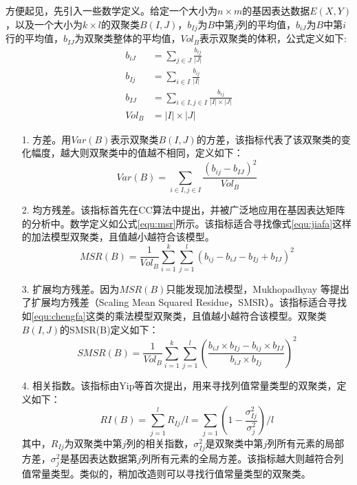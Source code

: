   方便起见，先引入一些数学定义。给定一个大小为$n\times m$的基因表达数据$E(X,Y)$，以及一个大小为$k\times l$的双聚类$B(I,J)$，$b_{Ij}$为$B$中第$j$列的平均值，$b_{iJ}$为$B$中第$i$行的平均值，$b_{IJ}$为双聚类整体的平均值，$Vol_B$表示双聚类的体积，公式定义如下:
  \begin{align}
    b_{iJ} &= \sum_{j\in J}\frac{b_{ij}}{|J|} \\
    b_{Ij} &= \sum_{i\in I}\frac{b_{ij}}{|I|} \\
    b_{IJ} &= \sum_{i\in I,j\in I}\frac{ b_{ij} }{|I| \times |J|}\\
    Vol_B &= |I| \times |J|
  \end{align}
  \begin{enumerate}
    \item[1.] 方差。用$Var(B)$表示双聚类$B(I,J)$的方差，该指标代表了该双聚类的变化幅度，越大则双聚类中的值越不相同，定义如下：
    \begin{equation}
      Var(B) = \sum_{i\in I,j\in I}\frac{(b_{ij}-b_{IJ})^2}{Vol_B}
    \end{equation}

    \item[2.] 均方残差。该指标首先在CC算法中提出，并被广泛地应用在基因表达矩阵的分析中。数学定义如公式\ref{equ:msr}所示。该指标适合寻找像式\ref{equ:jiafa}这样的加法模型双聚类，且值越小越符合该模型。
    \begin{equation}\label{equ:msr}
      MSR(B) = \frac{1}{Vol_B}\sum_{i=1}^k\sum_{j=1}^l(b_{ij}-b_{iJ}-b_{Ij}+b_{IJ})^2
    \end{equation}

    \item[3.] 扩展均方残差。因为$MSR(B)$只能发现加法模型，Mukhopadhyay 等提出了扩展均方残差（Scaling Mean Squared Residue，SMSR）。该指标适合寻找如\ref{equ:chengfa}这类的乘法模型双聚类，且值越小越符合该模型。双聚类$B(I,J)$的SMSR(B)定义如下：
    \begin{equation}\label{equ:smsr}
      SMSR(B) = \frac{1}{Vol_B}\sum_{i=1}^k\sum_{j=1}^l(\frac{b_{iJ}\times b_{Ij}-b_{ij}\times b_{IJ}}{b_{iJ}\times b_{Ij}})^2
    \end{equation}

    \item[4.] 相关指数。该指标由Yip等首次提出，用来寻找列值常量类型的双聚类，定义如下：
    \begin{equation}
      RI(B) = \sum_{j=1}^l R_{Ij}/l = \sum_{j=1}(1 - \frac{\sigma_{Ij}^2}{\sigma_j^2})/l
    \end{equation}
    \hspace{2em} 其中，$R_{Ij}$为双聚类中第$j$列的相关指数，$\sigma_{Ij}^2$是双聚类中第$j$列所有元素的局部方差，$\sigma_{j}^2$是基因表达数据第$j$列所有元素的全局方差。该指标越大则越符合列值常量类型。类似的，稍加改造则可以寻找行值常量类型的双聚类。


\end{enumerate}
